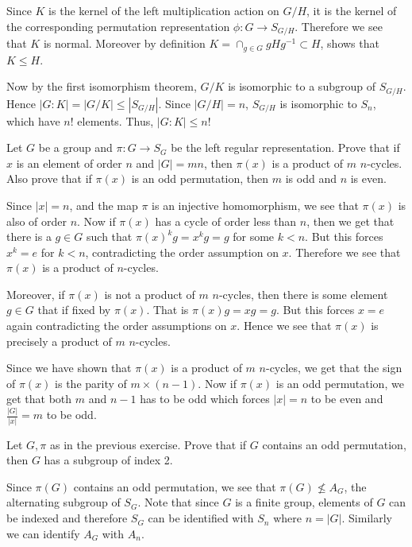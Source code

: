 \documentclass[12pt]{exam}
\theoremstyle{plain} %
\theoremstyle{definition} %
\theoremstyle{remark} %
\begin{document}
\begin{questions}
\begin{solution}
    Since $K$ is the kernel of the left multiplication action on
    $G/H$, it is the kernel of the corresponding permutation
    representation $\phi: G \to S_{G/H}$. Therefore we see that $K$ is
    normal. Moreover by definition $K = \cap_{ g \in G}gHg^{-1}
    \subset H$, shows that $K \leqslant H$.

    Now by the first isomorphism theorem, $G/K$ is isomorphic to a
    subgroup of $S_{G/H}$. Hence $|G:K| = |G/K| \le |S_{G/H}|$. Since
    $|G/H| = n$, $S_{G/H}$ is isomorphic to $S_n$, which have $n!$
    elements. Thus, $|G:K| \le n!$
  \end{solution}

  \question
  Let $G$ be a group and $ \pi: G \to S_G$ be the left regular
  \label{q:order_mod}
  representation. Prove that if $x$ is an element of order $n$ and
  $|G| = mn$, then $\pi(x)$ is a product of $m$ $n$-cycles. Also
  prove that if $\pi(x)$ is an odd permutation, then $m$ is odd and $n$ is even.
  \begin{solution}
    Since $|x| = n$, and the map $\pi$ is an injective homomorphism, we see that
    $\pi(x)$ is also of order $n$.
    Now if $\pi(x)$ has a cycle of order less than $n$, then we get
    that there is a $g \in G$ such that $\pi(x)^kg = x^kg = g$ for
    some $k < n$. But this forces $x^k = e$ for $k < n$,
    contradicting the order assumption on $x$. Therefore we see that
    $\pi(x)$ is a product of $n$-cycles.

    Moreover, if $\pi(x)$ is not a product of $m$ $n$-cycles, then
    there is some element $g \in G$ that if fixed by $\pi(x)$. That
    is $\pi(x)g = xg = g$. But this forces $x = e$ again
    contradicting the order assumptions on $x$.
    Hence we see that $\pi(x)$ is precisely a product of $m$ $n$-cycles.

    Since we have shown that $\pi(x)$ is a product of $m$ $n$-cycles,
    we get that the sign of $\pi(x)$ is the parity of $m \times (n-1)$.
    Now if $\pi(x)$ is an odd permutation, we get that both $m$ and
    $n-1$ has to be odd which forces $|x| = n$ to be even and
    $\frac{|G|}{|x|} = m$ to be odd.
  \end{solution}

  \question
  \label{q:3}
  Let $G, \pi$ as in the previous exercise. Prove that if $G$
  contains an odd permutation, then $G$ has a subgroup of index 2.
  \begin{solution}
    Since $\pi(G)$ contains an odd permutation, we see that $\pi(G)
    \nleqslant A_G$, the alternating subgroup of $S_G$. Note that
    since $G$ is a finite group, elements of $G$ can be indexed and
    therefore $S_G$ can be identified with $S_n$ where $n = |G|$. Similarly we
    can identify $A_G$ with $A_n$.


\end{solution}
\end{questions}
\end{document}
